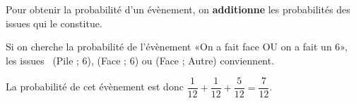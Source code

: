 \documentclass[
	classe=$2^{de}$
]{coursclass}
\begin{document}
\begin{propriete}
	Pour obtenir la probabilité d'un évènement, on \textbf{additionne} les probabilités des issues qui le constitue.
\end{propriete}

\begin{exemple}
	Si on cherche la probabilité de l'évènement «On a fait face OU on a fait un $6$», les issues \ (Pile ; $6$), (Face ; $6$) ou (Face ; Autre) conviennent.

	La probabilité de cet évènement est donc $\dfrac{1}{12} + \dfrac{1}{12} + \dfrac{5}{12} = \dfrac{7}{12}$.
\end{exemple}
\end{document}

